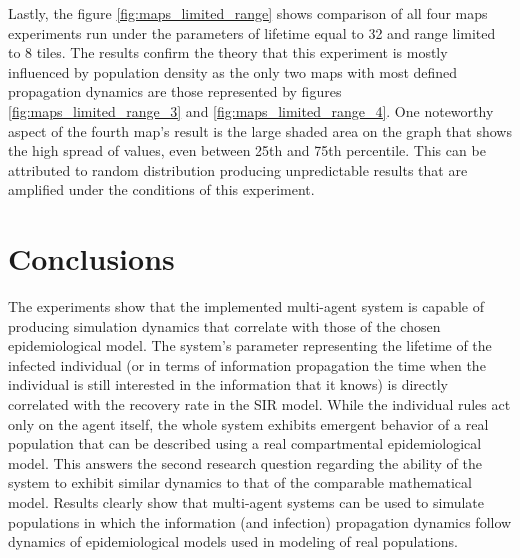 Lastly, the figure \ref{fig:maps_limited_range} shows comparison of all four maps experiments run under the parameters of lifetime equal to 32 and range limited to 8 tiles.
The results confirm the theory that this experiment is mostly influenced by population density as the only two maps with most defined propagation dynamics are those represented by figures \ref{fig:maps_limited_range_3} and \ref{fig:maps_limited_range_4}.
One noteworthy aspect of the fourth map's result is the large shaded area on the graph that shows the high spread of values, even between 25th and 75th percentile.
This can be attributed to random distribution producing unpredictable results that are amplified under the conditions of this experiment.

\pagebreak

\section{Conclusions}

The experiments show that the implemented multi-agent system is capable of producing simulation dynamics that correlate with those of the chosen epidemiological model.
The system's parameter representing the lifetime of the infected individual (or in terms of information propagation the time when the individual is still interested in the information that it knows) is directly correlated with the recovery rate in the SIR model.
While the individual rules act only on the agent itself, the whole system exhibits emergent behavior of a real population that can be described using a real compartmental epidemiological model.
This answers the second research question regarding the ability of the system to exhibit similar dynamics to that of the comparable mathematical model.
Results clearly show that multi-agent systems can be used to simulate populations in which the information (and infection) propagation dynamics follow dynamics of epidemiological models used in modeling of real populations.